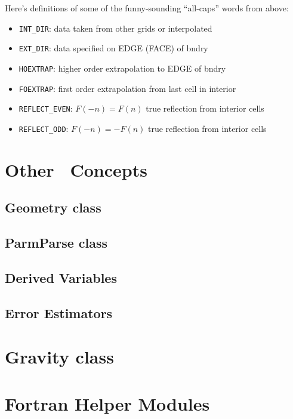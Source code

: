 Here's definitions of some of the funny-sounding ``all-caps''
words from above:
\begin{itemize}
\item {\tt INT\_DIR}: data taken from other grids or interpolated

\item {\tt EXT\_DIR}: data specified on EDGE (FACE) of bndry

\item {\tt HOEXTRAP}: higher order extrapolation to EDGE of bndry

\item {\tt FOEXTRAP}: first order extrapolation from last cell in interior

\item {\tt REFLECT\_EVEN}: $F(-n) = F(n)$ true reflection from interior cells

\item {\tt REFLECT\_ODD}: $F(-n) = -F(n)$ true reflection from interior cells
\end{itemize}





\section{Other \boxlib\ Concepts}

\subsection{Geometry class}

\subsection{ParmParse class}

\subsection{Derived Variables}

\subsection{Error Estimators}


\section{Gravity class}


\section{Fortran Helper Modules}

